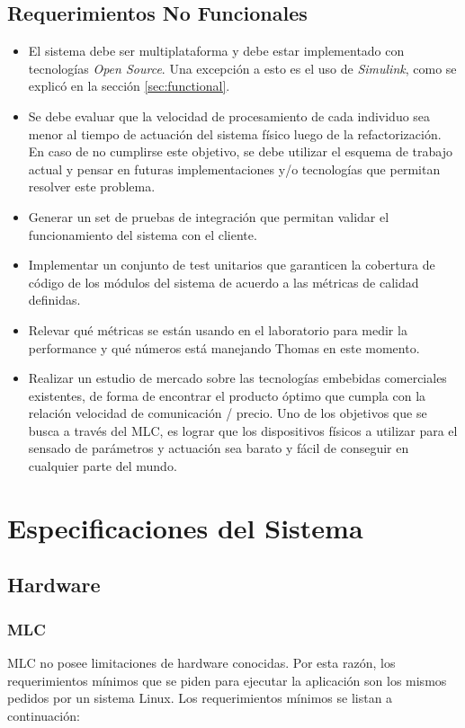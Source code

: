 \documentclass[a4paper,10pt]{article}
\begin{document}
    \subsection{Requerimientos No Funcionales} \label{sec:no_functional}
        \begin{itemize}
            \item El sistema debe ser multiplataforma y debe estar implementado con tecnologías \textit{Open Source}. Una excepción a
            esto es el uso de \textit{Simulink}, como se explicó en la sección \ref{sec:functional}.
            \item Se debe evaluar que la velocidad de procesamiento de cada individuo sea menor al tiempo de actuación 
            del sistema físico luego de la refactorización. En caso de no cumplirse este objetivo, se debe utilizar el esquema de trabajo 
            actual y pensar en futuras implementaciones y/o tecnologías que permitan resolver este problema.
            \item Generar un set de pruebas de integración que permitan validar el funcionamiento del sistema con el cliente.
            \item Implementar un conjunto de test unitarios que garanticen la cobertura de código de los módulos del sistema de acuerdo
            a las métricas de calidad definidas.
            \item Relevar qué métricas se están usando en el laboratorio para medir la performance y qué números está manejando Thomas en
            este momento.
            \item Realizar un estudio de mercado sobre las tecnologías embebidas comerciales existentes, de forma de encontrar el producto
            óptimo que cumpla con la relación velocidad de comunicación / precio. Uno de los objetivos que se busca a través del MLC, es
            lograr que los dispositivos físicos a utilizar para el sensado de parámetros y actuación sea barato y fácil de conseguir
            en cualquier parte del mundo.
        \end{itemize}

    \newpage
    \section{Especificaciones del Sistema}
    \subsection{Hardware}
    \subsubsection{MLC}
        MLC no posee limitaciones de hardware conocidas. Por esta razón, los requerimientos mínimos que se piden  para ejecutar la
        aplicación son los mismos pedidos por un sistema Linux. Los requerimientos mínimos se listan a continuación:
\end{document}
